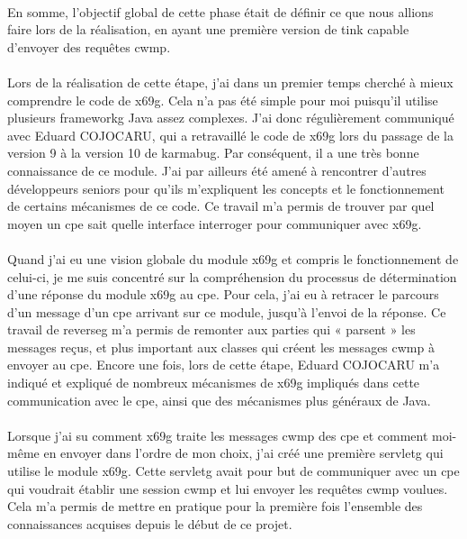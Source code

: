 \documentclass[12pt,a4paper]{report}
\begin{document}
\paragraph*{}En somme, l’objectif global de cette phase était de définir ce que nous
allions faire lors de la réalisation, en ayant une première version de \gls{tink} capable d’envoyer des requêtes \gls{cwmp}.
\paragraph*{}Lors de la réalisation de cette étape, j’ai dans un premier temps cherché
à mieux comprendre le code de \gls{x69g}. Cela n’a pas été simple pour moi puisqu’il utilise plusieurs \gls{frameworkg} Java assez complexes. J’ai donc régulièrement communiqué avec Eduard COJOCARU, qui a retravaillé le code de \gls{x69g} lors du passage de la version 9 à la version 10 de \gls{karmabug}. Par conséquent, il a une très bonne connaissance de ce module. J’ai par ailleurs été amené à rencontrer d’autres développeurs seniors pour qu’ils m’expliquent les concepts et le fonctionnement de certains mécanismes de ce code. Ce travail m’a permis de trouver par quel moyen un \gls{cpe} sait quelle interface interroger pour communiquer avec \gls{x69g}.
\paragraph*{} Quand j’ai eu une vision globale du module \gls{x69g} et compris le
fonctionnement de celui-ci, je me suis concentré sur la compréhension du processus de
détermination d’une réponse du module \gls{x69g} au \gls{cpe}. Pour cela, j’ai eu à retracer le parcours d’un message d’un \gls{cpe} arrivant sur ce module, jusqu’à l’envoi de la réponse. Ce travail de \gls{reverseg} m’a permis de remonter aux parties qui « parsent » les messages reçus, et plus important aux classes qui créent les messages \gls{cwmp} à envoyer au \gls{cpe}. Encore une fois, lors de cette étape, Eduard COJOCARU m’a indiqué et expliqué de nombreux mécanismes de \gls{x69g} impliqués dans cette communication avec le \gls{cpe}, ainsi que des mécanismes plus généraux de Java.
\paragraph*{}Lorsque j’ai su comment \gls{x69g} traite les messages \gls{cwmp} des \gls{cpe} et comment moi-même en envoyer dans l’ordre de mon choix, j’ai créé une première \gls{servletg} qui utilise le module \gls{x69g}. Cette \gls{servletg} avait pour but de communiquer avec un \gls{cpe} qui voudrait établir une session \gls{cwmp} et lui envoyer les requêtes \gls{cwmp} voulues. Cela m’a permis de mettre en pratique pour la première fois l’ensemble des connaissances acquises depuis le début de ce projet.
\end{document}
